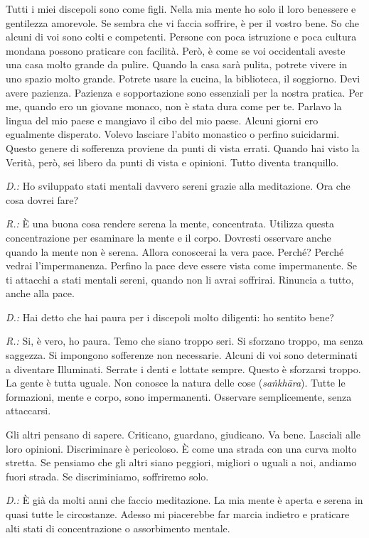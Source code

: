 Tutti i miei discepoli sono come figli. Nella mia mente ho solo il loro
benessere e gentilezza amorevole. Se sembra che vi faccia soffrire, è
per il vostro bene. So che alcuni di voi sono colti e competenti.
Persone con poca istruzione e poca cultura mondana possono praticare con
facilità. Però, è come se voi occidentali aveste una casa molto grande
da pulire. Quando la casa sarà pulita, potrete vivere in uno spazio
molto grande. Potrete usare la cucina, la biblioteca, il soggiorno. Devi
avere pazienza. Pazienza e sopportazione sono essenziali per la nostra
pratica. Per me, quando ero un giovane monaco, non è stata dura come per
te. Parlavo la lingua del mio paese e mangiavo il cibo del mio paese.
Alcuni giorni ero egualmente disperato. Volevo lasciare l'abito
monastico o perfino suicidarmi. Questo genere di sofferenza proviene da
punti di vista errati. Quando hai visto la Verità, però, sei libero da
punti di vista e opinioni. Tutto diventa tranquillo.

\emph{D.:} Ho sviluppato stati mentali davvero sereni grazie alla meditazione.
Ora che cosa dovrei fare?

\emph{R.:} È una buona cosa rendere serena la mente, concentrata. Utilizza
questa concentrazione per esaminare la mente e il corpo. Dovresti
osservare anche quando la mente non è serena. Allora conoscerai la vera
pace. Perché? Perché vedrai l'impermanenza. Perfino la pace deve essere
vista come impermanente. Se ti attacchi a stati mentali sereni, quando
non li avrai soffrirai. Rinuncia a tutto, anche alla pace.

\emph{D.:} Hai detto che hai paura per i discepoli molto diligenti: ho sentito
bene?

\emph{R.:} Si, è vero, ho paura. Temo che siano troppo seri. Si sforzano
troppo, ma senza saggezza. Si impongono sofferenze non necessarie.
Alcuni di voi sono determinati a diventare Illuminati. Serrate i denti e
lottate sempre. Questo è sforzarsi troppo. La gente è tutta uguale. Non
conosce la natura delle cose (\emph{saṅkhāra}). Tutte le formazioni,
mente e corpo, sono impermanenti. Osservare semplicemente, senza
attaccarsi.

Gli altri pensano di sapere. Criticano, guardano, giudicano. Va bene.
Lasciali alle loro opinioni. Discriminare è pericoloso. È come una
strada con una curva molto stretta. Se pensiamo che gli altri siano
peggiori, migliori o uguali a noi, andiamo fuori strada. Se
discriminiamo, soffriremo solo.

\emph{D.:} È già da molti anni che faccio meditazione. La mia mente è aperta e
serena in quasi tutte le circostanze. Adesso mi piacerebbe far marcia
indietro e praticare alti stati di concentrazione o assorbimento
mentale.

